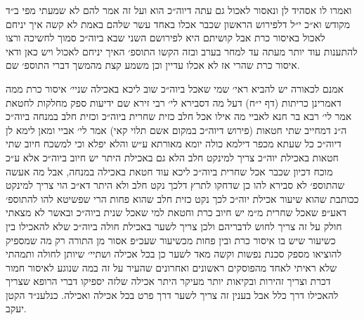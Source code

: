 \documentclass[12pt, openany]{book}
\begin{document}
\begin{multicols}{2}
ואמרו לו אסהיד לן ונאסור לאכול גם עתה דיוה״כ הוא ועל זה אמר להם לא שמעתי מפי ב״ד מקודש וא״כ י״ל דלפירוש הראשון שכבר אכלו באחד עשר שלהם באמת לא קשה איך יניחם לאכול באיסור כרת אבל קושיתם היא לפירושם השני שבא ביוה״כ סמוך לחשיכה ורצו להתענות עוד יותר מעתה עד למחר בערב ובזה הקשו התוספ׳ האיך יניחם לאכול ויש כאן ודאי איסור כרת שהרי אז לא אכלו עדיין וכן משמע קצת מהמשך דברי התוספ׳ שם.\\\vspace{0pt}

אמנם לכאורה יש להביא ראי׳ שמי שאכל ביוה״כ שוב ליכא באכילה שניי׳ איסור כרת ממה דאמרינן כריתות (דף י״ח) דעל מה דסבירא לי׳ רבי זירא שם ידיעות ספק מחלקות לחטאת אמר לי׳ רבא בר חנא לאביי מה אילו אכל חלב כזית שחרית ביוה״כ וכזית חלב במנחה ביוה״כ ה״נ דמחייב שתי חטאות (פירוש דיוה״כ במקום אשם תלוי קאי) אמר לי׳ אביי ומאן לימא לן דיוה״כ כל שעתא מכפר דילמא כולה יומא מאורתא ע״ש והלא יפלא וכי למשכח חיוב שתי חטאות באכילת יוה״כ צריך למינקט חלב הלא גם באכילת היתר יש חיוב ביוה״כ אלא ע״כ מוכח דכיון שכבר אכל שחרית ביוה״כ ליכא עוד חטאת באכילה במנחה, אבל מה אעשה שהתוספ׳ לא סבירא להו כן שדחקו לתרץ דלכך נקט חלב ולא היתר דא״כ הוי צריך למינקט ככותבת שהוא שיעור אכילת יוה״כ לכך נקט כזית חלב שהוא פחות הרי שפשיטא להו להתוספ׳ דאע״פ שאכל שחרית מ״מ יש חיוב כרת וחטאת למי שאכל שנית ביוה״כ ובאשר לא מצאתי חולק על זה צריך לחוש לדבריהם ולכן צריך לשער באכילת חולה ביוה״כ שלא להאכילו בין כשיעור שיש בו איסור כרת ובין פחות מכשיעור שעכ״פ אסור מן התורה רק מה שמספיק להוציאו מספק סכנת נפשות וקשה מאד לשער כן בכל אכילה ושתיי׳ שיותן לחולה ותמהתי שלא ראיתי לאחד מהפוסקים ראשונים ואחרונים שהעיר על זה במה שנוגע לאיסור חמור דכרת וצריך זהירות ובקיאות יותר מעיקר היתר אכילה שלזה יספיקו דברי הרופא שצריך להאכילו דרך כלל אבל בענין זה צריך לשער דרך פרט בכל אכילה ואכילה. כנלענ״ד הקטן יעקב.\\\vspace{0pt}

\end{multicols}\newpage
\end{document}
